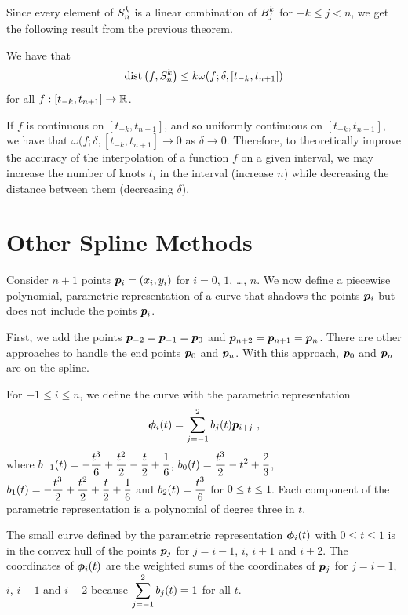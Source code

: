 Since every element of $\displaystyle S_n^k$ is a linear combination of
$\displaystyle B_{j}^k$ for $-k \leq j <n$, we get the following result from the
previous theorem.

\begin{cor}
We have that
\[
  \mathrm{dist}\left(f,S_n^k\right) \leq k \omega(f;\delta, [t_{-k},t_{n+1}])
\]
for all $f:[t_{-k},t_{n+1}] \to \mathbb{R}$.
\end{cor}

If $f$ is continuous on $[t_{-k},t_{n-1}]$, and so uniformly
continuous on $[t_{-k},t_{n-1}]$, we have that 
$\omega(f;\delta, [t_{-k},t_{n+1}] \to 0$ as $\delta \to 0$.
Therefore, to theoretically improve the accuracy of the interpolation of a
function $f$ on a given interval, we may increase the number of knots
$t_i$ in the interval (increase $n$) while decreasing the
distance between them (decreasing $\delta$).

\section{Other Spline Methods}

Consider $n+1$ points $\bm{p}_i = (x_i,y_i)$ for $i=0$, $1$,
\ldots, $n$.  We now define a piecewise polynomial, parametric
representation of a curve that shadows the points $\bm{p}_i$
but does not include the points $\bm{p}_i$.

First, we add the points $\bm{p}_{-2} = \bm{p}_{-1} = \bm{p}_0$ and
$\bm{p}_{n+2} = \bm{p}_{n+1} = \bm{p}_n$.  There are other
approaches to handle the end points $\bm{p}_0$ and $\bm{p}_n$.  With
this approach, $\bm{p}_0$ and $\bm{p}_n$ are on the spline.

For $-1 \leq i \leq n$, we define the curve with the parametric
representation
\begin{equation} \label{Bspline}
\bm{\phi}_i(t) = \sum_{j=-1}^2 b_j(t) \bm{p}_{i+j} \  ,
\end{equation}
where
$\displaystyle
b_{-1}(t) = -\frac{t^3}{6} + \frac{t^2}{2} - \frac{t}{2} + \frac{1}{6}$,
$\displaystyle b_0(t) = \frac{t^3}{2} - t^2 + \frac{2}{3}$,
$\displaystyle
b_1(t) = -\frac{t^3}{2} + \frac{t^2}{2} + \frac{t}{2} + \frac{1}{6}$
and
$\displaystyle b_2(t) = \frac{t^3}{6}$
for $0 \leq t \leq 1$.  Each component of the parametric representation
is a polynomial of degree three in $t$.

The small curve defined by the parametric representation
$\bm{\phi}_i(t)$ with $0\leq t \leq 1$ is in the convex hull of the 
points $\bm{p}_j$ for $j=i-1$, $i$, $i+1$ and $i+2$.  The coordinates
of $\bm{\phi}_i(t)$ are the weighted sums of the coordinates of
$\bm{p}_j$ for $j=i-1$, $i$, $i+1$ and $i+2$ because
$\displaystyle \sum_{j=-1}^2 b_j(t) = 1 $ for all $t$.

